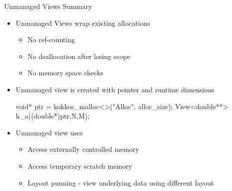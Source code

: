 
\begin{frame}[fragile]{Unmanaged Views Summary}

\vspace{-10pt}

  \begin{itemize}
    \item{Unmanaged Views wrap existing allocations} 
    \begin{itemize}
       \item{No ref-counting}
       \item{No deallocation after losing scope}
       \item{No memory space checks}
    \end{itemize}
    \pause
    \item{Unmanaged view is created with pointer and runtime dimensions }  
    \pause
  \begin{code}[keywords={}]
void* ptr = kokkos_malloc<>("Alloc", alloc_size);
View<double**> h_a((double*)ptr,N,M);
  \end{code}
  \pause
    \item {Unmanaged view uses}
    \begin{itemize}
    \item {Access externally controlled memory }
    \item {Access temporary scratch memory}
    \item {Layout punning - view underlying data using different layout}
    \end{itemize} 
  \end{itemize}

\end{frame}
